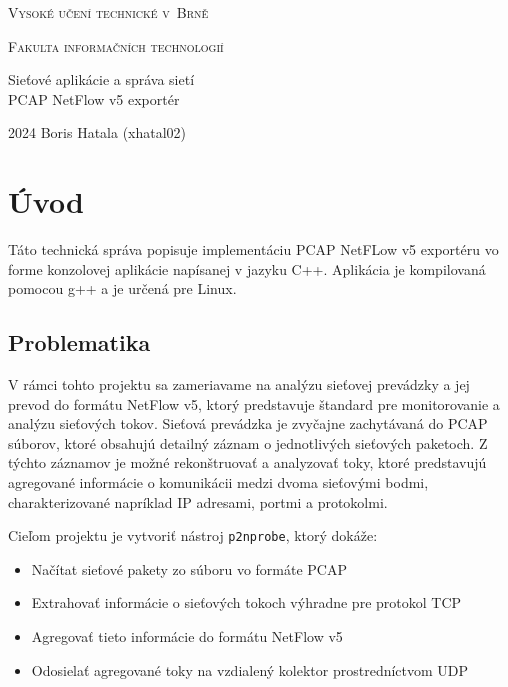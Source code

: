 \documentclass[11pt, a4paper]{article}
\begin{document}
\begin{titlepage}
\thispagestyle{empty}

    \begin{center}

        {\Huge \textsc{Vysoké učení technické v~Brně \\[0.5em]}}

        {\huge \textsc{Fakulta informačních technologií}}


        {\LARGE Sieťové aplikácie a správa sietí \\[0.5em]
        PCAP NetFlow v5 exportér
         }


    \end{center}
{\Large 2024 \hfill Boris Hatala (xhatal02)}

\end{titlepage}

\newpage
\tableofcontents
\newpage

\section{Úvod}
Táto technická správa popisuje implementáciu PCAP NetFLow v5 exportéru vo forme konzolovej aplikácie
napísanej v jazyku C++. Aplikácia je kompilovaná pomocou g++ a je určená pre Linux.

\subsection*{Problematika}
V rámci tohto projektu sa zameriavame na analýzu sieťovej prevádzky a jej prevod do formátu NetFlow v5, ktorý predstavuje štandard pre monitorovanie a analýzu sieťových tokov. Sieťová prevádzka je zvyčajne zachytávaná do PCAP súborov, ktoré obsahujú detailný záznam o jednotlivých sieťových paketoch. Z týchto záznamov je možné rekonštruovať a analyzovať toky, ktoré predstavujú agregované informácie o komunikácii medzi dvoma sieťovými bodmi, charakterizované napríklad IP adresami, portmi a protokolmi.
\vspace{0.3cm}

Cieľom projektu je vytvoriť nástroj \texttt{p2nprobe}, ktorý dokáže:
\begin{itemize}
    \item Načítat sieťové pakety zo súboru vo formáte PCAP
    \item Extrahovať informácie o sieťových tokoch výhradne pre protokol TCP
    \item Agregovať tieto informácie do formátu NetFlow v5
    \item Odosielať agregované toky na vzdialený kolektor prostredníctvom UDP
\end{itemize}
\end{document}
